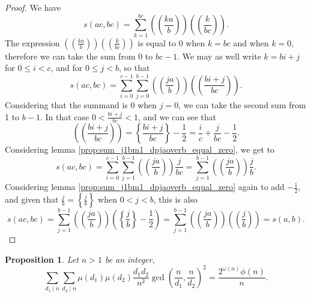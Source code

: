 \documentclass[a4paper,12pt]{article}
\newtheorem{proposition}{Proposition}[section]
\newcommand{\doublepariii}[1]{\left(\!\!\!\left(#1\right)\!\!\!\right)}
\newcommand{\doubleparii}[1]{\left(\!\!\left(#1\right)\!\!\right)}
\begin{document}
\begin{proof} We have
\begin{equation*}
s(ac,bc) = \sum_{k=1}^{bc} \doublepariii{\frac{ka}{b}}\doublepariii{\frac{k}{bc}}.
\end{equation*}
The expression $\doubleparii{\frac{ka}{b}}\doubleparii{\frac{k}{bc}}$ is equal to 0 when $k=bc$ and when $k=0$, therefore we can take the sum from 0 to $bc-1$. We may as well write $k=bi+j$ for $0\leq i<c$, and for $0\leq j<b$, so that
\begin{equation*}
s(ac,bc) = \sum_{i=0}^{c-1}\sum_{j=0}^{b-1} \doublepariii{\frac{ja}{b}}\doublepariii{\frac{bi+j}{bc}}.
\end{equation*}
Considering that the summand is 0 when $j=0$, we can take the second sum from 1 to $b-1$. In that case $0<\frac{bi+j}{bc}<1$, and we can see that
\begin{equation*}
\doublepariii{\frac{bi+j}{bc}} = \left\{\frac{bi+j}{bc}\right\}-\frac{1}{2} = \frac{i}{c}+\frac{j}{bc}-\frac{1}{2}.
\end{equation*}
Considering lemma \ref{prop:sum_j1bm1_dpjaoverb_equal_zero}, we get to
\begin{equation*}
s(ac,bc) = \sum_{i=0}^{c-1}\sum_{j=1}^{b-1} \doublepariii{\frac{ja}{b}}\frac{j}{bc} = \sum_{j=1}^{b-1} \doublepariii{\frac{ja}{b}}\frac{j}{b}.
\end{equation*}
Considering lemma \ref{prop:sum_j1bm1_dpjaoverb_equal_zero} again to add $-\frac{1}{2}$, and given that $\frac{j}{b}=\left\{\frac{j}{b}\right\}$ when $0<j<b$, this is also
\begin{equation*}
s(ac,bc) = \sum_{j=1}^{b-1} \doublepariii{\frac{ja}{b}}\left(\left\{\frac{j}{b}\right\}-\frac{1}{2}\right) = \sum_{j=1}^{b-1} \doublepariii{\frac{ja}{b}}\doublepariii{\frac{j}{b}} = s(a,b).
\end{equation*}
\end{proof}

\begin{proposition}\label{prop:formule_fn_Delange} Let $n>1$ be an integer,
\begin{equation}
\sum_{d_1 \mid n} \sum_{d_2 \mid n} \mu(d_1) \mu(d_2) \frac{d_1d_2}{n^2}\gcd\left(\frac{n}{d_1},\frac{n}{d_2}\right)^2 = \frac{2^{\omega(n)}\phi(n)}{n}.
\label{eq:formule_fn_Delange}
\end{equation}
\end{proposition}
\end{document}
